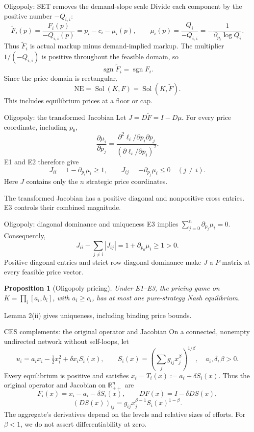 \documentclass[11pt,aspectratio=169]{beamer}
\theoremstyle{plain}
\newtheorem{proposition}{Proposition}
\theoremstyle{definition}
\newcommand{\R}{\mathbb{R}}
\DeclareMathOperator{\sgn}{sgn}
\DeclareMathOperator{\Sol}{Sol}
\newcommand{\compactmath}{%
 \setlength{\abovedisplayskip}{4pt}\setlength{\belowdisplayskip}{4pt}%
 \setlength{\abovedisplayshortskip}{2pt}\setlength{\belowdisplayshortskip}{4pt}}
\begin{document}
\begin{frame}{Oligopoly: SET removes the demand-slope scale}
\compactmath
Divide each component by the positive number $-Q_{i,i}$:
\[
 \widetilde F_i(p)=\frac{F_i(p)}{-Q_{i,i}(p)}
 =p_i-c_i-\mu_i(p),
 \qquad
 \mu_i(p)=\frac{Q_i}{-Q_{i,i}}
 =-\frac1{\partial_{p_i}\log Q_i}.
\]
Thus $\widetilde F_i$ is actual markup minus demand-implied markup.
The multiplier $1/(-Q_{i,i})$ is positive throughout the feasible domain, so
\[
 \sgn\widetilde F_i=\sgn F_i.
\]
Since the price domain is rectangular,
\[
 \boxed{\mathrm{NE}=\Sol(K,F)=\Sol(K,\widetilde F).}
\]
This includes equilibrium prices at a floor or cap.
\end{frame}


\begin{frame}{Oligopoly: the transformed Jacobian}
\compactmath
Let $J=D\widetilde F=I-D\mu$. For every price coordinate, including $p_0$,
\[
 \frac{\partial\mu_i}{\partial p_j}
 =\frac{\partial^2\ell_i/\partial p_i\partial p_j}
 {(\partial\ell_i/\partial p_i)^2}.
\]
E1 and E2 therefore give
\[
 \boxed{
 J_{ii}=1-\partial_{p_i}\mu_i\geq1,\qquad
 J_{ij}=-\partial_{p_j}\mu_i\leq0\quad(j\ne i).}
\]
Here $J$ contains only the $n$ strategic price coordinates.
\medskip\par
The transformed Jacobian has a positive diagonal and nonpositive cross entries.
E3 controls their combined magnitude.
\end{frame}


\begin{frame}{Oligopoly: diagonal dominance and uniqueness}
\compactmath
E3 implies $\sum_{j=0}^n\partial_{p_j}\mu_i=0$. Consequently,
\[
 \boxed{
 J_{ii}-\sum_{j\ne i}|J_{ij}|
 =1+\partial_{p_0}\mu_i\geq1>0.}
\]
Positive diagonal entries and strict row diagonal dominance make $J$
a $P$-matrix at every feasible price vector.
\setcounter{proposition}{3}
\begin{proposition}[Oligopoly pricing]
Under E1--E3, the pricing game on $K=\prod_i[a_i,b_i]$, with $a_i\geq c_i$,
has \alert{at most one} pure-strategy Nash equilibrium.
\end{proposition}
Lemma 2(ii) gives uniqueness, including binding price bounds.
\end{frame}


\begin{frame}{CES complements: the original operator and Jacobian}
\small\compactmath
On a connected, nonempty undirected network without self-loops, let
\[
 u_i=a_ix_i-\tfrac12x_i^2+\delta x_iS_i(x),\qquad
 S_i(x)=\left(\sum_jg_{ij}x_j^\beta\right)^{1/\beta},
 \quad a_i,\delta,\beta>0.
\]
Every equilibrium is positive and satisfies $x_i=T_i(x):=a_i+\delta S_i(x)$.
Thus the original operator and Jacobian on $\R_{++}^n$ are
\[
 F_i(x)=x_i-a_i-\delta S_i(x),\qquad
 \boxed{DF(x)=I-\delta DS(x),}
\]
\[
 (DS(x))_{ij}=g_{ij}x_j^{\beta-1}S_i(x)^{1-\beta}.
\]
The aggregate's derivatives depend on the levels and relative sizes of efforts.
For $\beta<1$, we do not assert differentiability at zero.
\end{frame}
\end{document}
